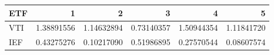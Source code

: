 \begin{tabular}{lrrrrr}
\toprule
ETF & 1 & 2 & 3 & 4 & 5 \\
\midrule
VTI & 1.38891556 & 1.14632894 & 0.73140357 & 1.50944354 & 1.11841720 \\
IEF & 0.43275276 & 0.10217090 & 0.51986895 & 0.27570544 & 0.08607574 \\
\bottomrule
\end{tabular}
